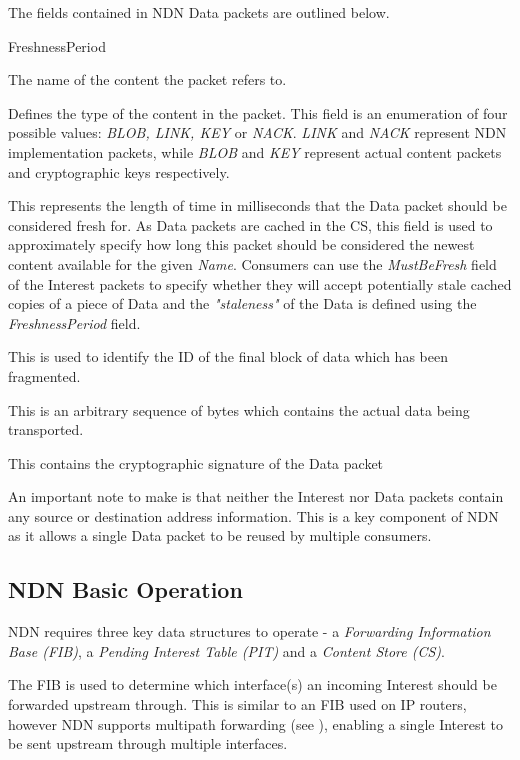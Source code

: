 \vspace{5mm}
The fields contained in NDN Data packets are outlined below.

\begin{labeling}{FreshnessPeriod }
    \item [Name] The name of the content the packet refers to.
    \item [ContentType] Defines the type of the content in the packet. This field is an enumeration of four possible values: \textit{BLOB, LINK, KEY} or \textit{NACK}. \textit{LINK} and \textit{NACK} represent NDN implementation packets, while \textit{BLOB} and \textit{KEY} represent actual content packets and cryptographic keys respectively.
    \item [FreshnessPeriod] This represents the length of time in milliseconds that the Data packet should be considered fresh for. As Data packets are cached in the CS, this field is used to approximately specify how long this packet should be considered the newest content available for the given \textit{Name}. Consumers can use the \textit{MustBeFresh} field of the Interest packets to specify whether they will accept potentially stale cached copies of a piece of Data and the \textit{"staleness"} of the Data is defined using the \textit{FreshnessPeriod} field.
    \item [FinalBlockId] This is used to identify the ID of the final block of data which has been fragmented.
    \item [Content] This is an arbitrary sequence of bytes which contains the actual data being transported.
    \item [Signature] This contains the cryptographic signature of the Data packet
\end{labeling}

An important note to make is that neither the Interest nor Data packets contain any source or destination address information. This is a key component of NDN as it allows a single Data packet to be reused by multiple consumers. 

\subsection{NDN Basic Operation}\label{sec:ndn-basic-operation}
NDN requires three key data structures to operate - a \textit{Forwarding Information Base (FIB)}, a \textit{Pending Interest Table (PIT)} and a \textit{Content Store (CS)}. 

The FIB is used to determine which interface(s) an incoming Interest should be forwarded upstream through. This is similar to an FIB used on IP routers, however NDN supports multipath forwarding (see ), enabling a single Interest to be sent upstream through multiple interfaces. 

